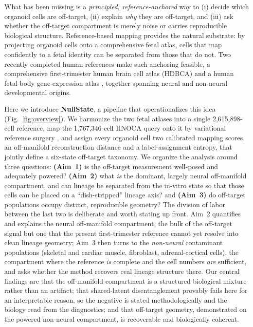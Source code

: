 \documentclass[11pt]{article}
\newcommand{\nref}{2{,}615{,}898}
\newcommand{\nquery}{1{,}767{,}346}
\begin{document}
What has been missing is a \emph{principled, reference-anchored} way to (i) decide which organoid cells
are off-target, (ii) explain \emph{why} they are off-target, and (iii) ask whether the off-target
compartment is merely noise or carries reproducible biological structure. Reference-based mapping
provides the natural substrate: by projecting organoid cells onto a comprehensive fetal atlas, cells
that map confidently to a fetal identity can be separated from those that do not. Two
recently completed human references make such anchoring feasible, a comprehensive first-trimester
human brain cell atlas (HDBCA) \citep{braun2023hdbca} and a human fetal-body gene-expression atlas
\citep{cao2020fetal}, together spanning neural and non-neural developmental origins.

Here we introduce \textbf{NullState}, a pipeline that operationalizes this idea (Fig.~\ref{fig:overview}).
We harmonize the two fetal atlases into a single \nref-cell reference, map the \nquery-cell HNOCA query
onto it by variational reference surgery \citep{lopez2018scvi,xu2021scanvi,lotfollahi2022scarches},
and assign every organoid cell two calibrated mapping scores, an off-manifold reconstruction distance
and a label-assignment entropy, that jointly define a six-state off-target taxonomy. We organize the
analysis around three questions: \textbf{(Aim~1)} is the off-target measurement well-posed and
adequately powered? \textbf{(Aim~2)} what \emph{is} the dominant, largely neural off-manifold
compartment, and can lineage be separated from the in-vitro state so that those cells can be placed on a
``dish-stripped'' lineage axis? and \textbf{(Aim~3)} do off-target populations occupy distinct,
reproducible geometry? The division of labor between the last two is deliberate and worth stating
up front. Aim~2 quantifies and explains the neural off-manifold compartment, the bulk of the off-target
signal but one that the present first-trimester reference cannot yet resolve into clean lineage
geometry; Aim~3 then turns to the \emph{non-neural} contaminant populations (skeletal and cardiac
muscle, fibroblast, adrenal-cortical cells), the compartment where the reference \emph{is} complete and
the cell numbers \emph{are} sufficient, and asks whether the method recovers real lineage structure
there. Our central findings are that the off-manifold compartment is a structured biological mixture
rather than an artifact; that shared-latent disentanglement provably fails here for an interpretable
reason, so the negative is stated methodologically and the biology read from the diagnostics; and that
off-target geometry, demonstrated on the powered non-neural compartment, is recoverable and
biologically coherent.
\end{document}
